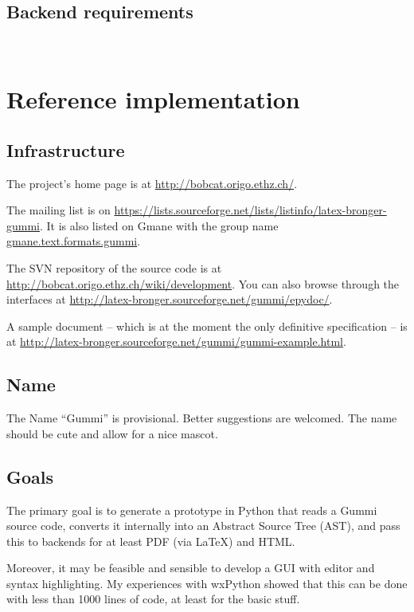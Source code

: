 \documentclass[12pt,openany]{book}
\begin{document}
~


~

\section{Backend requirements}

~


\chapter{Reference implementation}

\section{Infrastructure}

The project's home page is at \url{http://bobcat.origo.ethz.ch/}.

The mailing list is on
\url{https://lists.sourceforge.net/lists/listinfo/latex-bronger-gummi}.  It is
also listed on Gmane with the group name \url{gmane.text.formats.gummi}.

The SVN repository of the source code is at
\url{http://bobcat.origo.ethz.ch/wiki/development}.  You can also browse through
the interfaces at \url{http://latex-bronger.sourceforge.net/gummi/epydoc/}.

A sample document -- which is at the moment the only definitive specification
-- is at
\url{http://latex-bronger.sourceforge.net/gummi/gummi-example.html}.

\section{Name}

The Name ``Gummi'' is provisional.  Better suggestions are welcomed.  The name
should be cute and allow for a nice mascot.


\section{Goals}

The primary goal is to generate a prototype in Python that reads a Gummi
source code, converts it internally into an Abstract Source Tree (AST), and
pass this to backends for at least PDF (via \LaTeX) and HTML\@.

Moreover, it may be feasible and sensible to develop a GUI with editor and
syntax highlighting.  My experiences with wxPython showed that this can be done
with less than 1000 lines of code, at least for the basic stuff.
\end{document}
